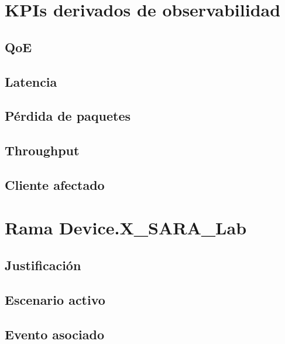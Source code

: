 \section{KPIs derivados de observabilidad}
\label{sec:kpis-derivados-observabilidad}

\subsection{QoE}
\label{subsec:qoe-observabilidad}

\subsection{Latencia}
\label{subsec:latencia-observabilidad}

\subsection{Pérdida de paquetes}
\label{subsec:perdida-paquetes-observabilidad}

\subsection{Throughput}
\label{subsec:throughput-observabilidad}

\subsection{Cliente afectado}
\label{subsec:cliente-afectado}


\section{Rama Device.X\_SARA\_Lab}
\label{sec:rama-device-xsara-lab}

\subsection{Justificación}
\label{subsec:justificacion-rama-xsara-lab}

\subsection{Escenario activo}
\label{subsec:escenario-activo}

\subsection{Evento asociado}
\label{subsec:evento-asociado}

